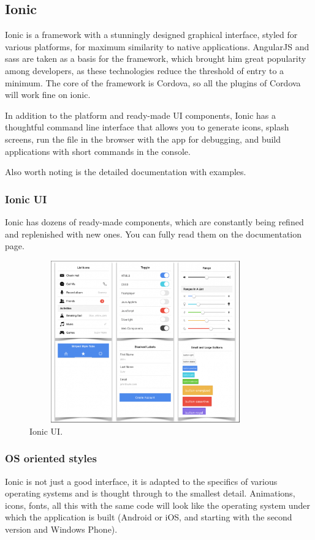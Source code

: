 \subsection{Ionic}
Ionic is a framework with a stunningly designed graphical interface, styled for various platforms, for maximum similarity to native applications. AngularJS and sass are taken as a basis for the framework, which brought him great popularity among developers, as these technologies reduce the threshold of entry to a minimum. The core of the framework is Cordova, so all the plugins of Cordova will work fine on ionic.\par In addition to the platform and ready-made UI components, Ionic has a thoughtful command line interface that allows you to generate icons, splash screens, run the file in the browser with the app for debugging, and build applications with short commands in the console.\par Also worth noting is the detailed documentation with examples.\cite{Ionic}

\subsubsection{Ionic UI}
Ionic has dozens of ready-made components, which are constantly being refined and replenished with new ones. You can fully read them on the documentation page.\cite{IonicUI}

\begin{figure}[h]
\centering
\includegraphics[width=10cm, height=7cm]{img/IonicUI.png}
\caption{Ionic UI.}
\end{figure}

\subsubsection{OS oriented styles}
Ionic is not just a good interface, it is adapted to the specifics of various operating systems and is thought through to the smallest detail. Animations, icons, fonts, all this with the same code will look like the operating system under which the application is built (Android or iOS, and starting with the second version and Windows Phone).\cite{IonicOS}

